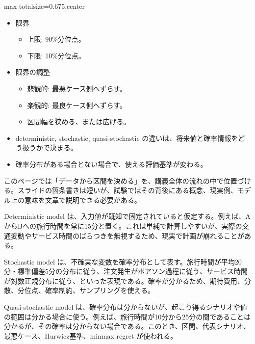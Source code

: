 \clearpage
{}
\begin{adjustbox}{max totalsize={\textwidth}{0.675\textheight},center}
\begin{minipage}{\textwidth}\scriptsize
\begin{minipage}[t]{0.485\textwidth}
\begin{itemize}
\item 限界
\begin{itemize}
\item 上限: 90\%分位点。
\item 下限: 10\%分位点。
\end{itemize}
\item 限界の調整
\begin{itemize}
\item 悲観的: 最悪ケース側へずらす。
\item 楽観的: 最良ケース側へずらす。
\item 区間幅を狭める、または広げる。
\end{itemize}
\end{itemize}
\begin{itemize}
\item deterministic, stochastic, quasi-stochastic の違いは、将来値と確率情報をどう扱うかで決まる。
\item 確率分布がある場合とない場合で、使える評価基準が変わる。
\end{itemize}
\end{minipage}\hfill
\begin{minipage}[t]{0.485\textwidth}
このページでは「データから区間を決める」を、講義全体の流れの中で位置づける。スライドの箇条書きは短いが、試験ではその背後にある概念、現実例、モデル上の意味を文章で説明できる必要がある。\par
Deterministic model は、入力値が既知で固定されていると仮定する。例えば、AからBへの旅行時間を常に15分と置く。これは単純で計算しやすいが、実際の交通変動やサービス時間のばらつきを無視するため、現実で計画が崩れることがある。\par
Stochastic model は、不確実な変数を確率分布として表す。旅行時間が平均20分・標準偏差5分の分布に従う、注文発生がポアソン過程に従う、サービス時間が対数正規分布に従う、といった表現である。確率が分かるため、期待費用、分散、分位点、確率制約、サンプリングを使える。\par
Quasi-stochastic model は、確率分布は分からないが、起こり得るシナリオや値の範囲は分かる場合に使う。例えば、旅行時間が10分から25分の間であることは分かるが、その確率は分からない場合である。このとき、区間、代表シナリオ、最悪ケース、Hurwicz基準、minmax regret が使われる。\par

\end{minipage}
\end{minipage}
\end{adjustbox}
